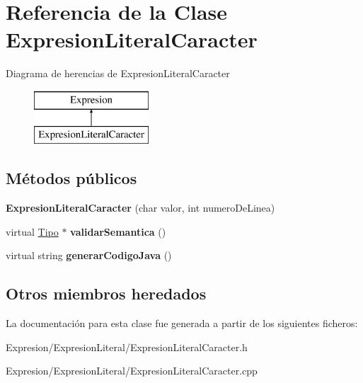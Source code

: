 \hypertarget{class_expresion_literal_caracter}{\section{Referencia de la Clase Expresion\-Literal\-Caracter}
\label{class_expresion_literal_caracter}
}
Diagrama de herencias de Expresion\-Literal\-Caracter\begin{figure}[H]
\begin{center}
\leavevmode
\includegraphics[height=2.000000cm]{class_expresion_literal_caracter}
\end{center}
\end{figure}
\subsection*{Métodos públicos}
\begin{DoxyCompactItemize}
\item 
\hypertarget{class_expresion_literal_caracter_ab2927730e3b84b9d435c0c4c52fd6726}{{\bfseries Expresion\-Literal\-Caracter} (char valor, int numero\-De\-Linea)}\label{class_expresion_literal_caracter_ab2927730e3b84b9d435c0c4c52fd6726}

\item 
\hypertarget{class_expresion_literal_caracter_a178394c347ea98a4eeb489adabe5f5b0}{virtual \hyperlink{class_tipo}{Tipo} $\ast$ {\bfseries validar\-Semantica} ()}\label{class_expresion_literal_caracter_a178394c347ea98a4eeb489adabe5f5b0}

\item 
\hypertarget{class_expresion_literal_caracter_aa4894fa895257bce99a6bf9dbe1d4d03}{virtual string {\bfseries generar\-Codigo\-Java} ()}\label{class_expresion_literal_caracter_aa4894fa895257bce99a6bf9dbe1d4d03}

\end{DoxyCompactItemize}
\subsection*{Otros miembros heredados}


La documentación para esta clase fue generada a partir de los siguientes ficheros\-:\begin{DoxyCompactItemize}
\item 
Expresion/\-Expresion\-Literal/Expresion\-Literal\-Caracter.\-h\item 
Expresion/\-Expresion\-Literal/Expresion\-Literal\-Caracter.\-cpp\end{DoxyCompactItemize}

